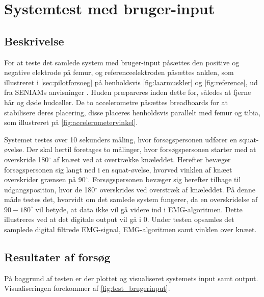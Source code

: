 \section{Systemtest med bruger-input}

\subsection{Beskrivelse}
For at teste det samlede system med bruger-input påsættes den positive og negative elektrode på femur, og referenceelektroden påsættes anklen, som illustreret i \autoref{sec:pilotforsoeg} på henholdsvis \autoref{fig:laarmuskler} og \autoref{fig:reference}, ud fra SENIAMs anvisninger \citep{seniam2016}. Huden præpareres inden dette for, således at fjerne hår og døde hudceller. 
De to accelerometre påsættes breadboards for at stabilisere deres placering, disse placeres henholdsvis parallelt med femur og tibia, som illustreret på \autoref{fig:accelerometervinkel}.

Systemet testes over 10 sekunders måling, hvor forsøgspersonen udfører en squat-øvelse. Der skal hertil foretages to målinger, hvor forsøgspersonen starter med at overskride 180$^{\circ}$ af knæet ved at overtrække knæleddet. Herefter bevæger forsøgspersonen sig langt ned i en squat-øvelse, hvorved vinklen af knæet overskrider grænsen på 90$^{\circ}$. Forsøgspersonen bevæger sig herefter tilbage til udgangsposition, hvor de 180$^{\circ}$ overskrides ved overstræk af knæleddet.
På denne måde testes det, hvorvidt om det samlede system fungerer, da en overskridelse af $90-180^{\circ}$ vil betyde, at data ikke vil gå videre ind i EMG-algoritmen. Dette illustreres ved at det digitale output vil gå i 0. Under testen opsamles det samplede digital filtrede EMG-signal, EMG-algoritmen samt vinklen over knæet.

\subsection{Resultater af forsøg}
På baggrund af testen er der plottet og visualiseret systemets input samt output. Visualiseringen forekommer af \autoref{fig:test_brugerinput}. 
 
